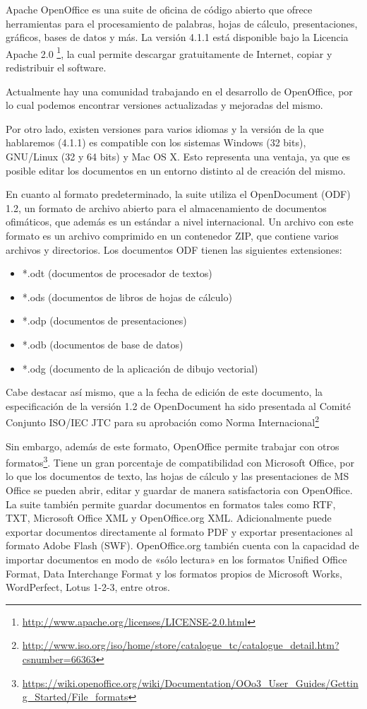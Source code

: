 \documentclass[12pt]{article}
\begin{document}
Apache OpenOffice es una suite de oficina de código abierto que ofrece herramientas para el procesamiento de palabras, hojas de cálculo, presentaciones, gráficos, bases de datos y más. La versión 4.1.1 está disponible bajo la Licencia Apache 2.0 \footnote{\url{http://www.apache.org/licenses/LICENSE-2.0.html}}, la cual permite descargar gratuitamente de Internet, copiar y redistribuir el software.   

Actualmente hay una comunidad trabajando en el desarrollo de OpenOffice, por lo cual podemos encontrar versiones actualizadas y mejoradas del mismo.

Por otro lado, existen versiones para varios idiomas y la versión de la que hablaremos (4.1.1) es compatible con los sistemas Windows (32 bits), GNU/Linux (32 y 64 bits) y Mac OS X. Esto representa una ventaja, ya que es posible editar los documentos en un entorno distinto al de creación del mismo.

En cuanto al formato predeterminado, la suite utiliza el OpenDocument (ODF) 1.2, un formato de archivo abierto para el almacenamiento de documentos ofimáticos, que además es un estándar a nivel internacional. Un archivo con este formato es un archivo comprimido en un contenedor ZIP, que contiene varios archivos y directorios. Los documentos ODF tienen las siguientes extensiones:
\begin{itemize}
\item *.odt (documentos de procesador de textos)
\item *.ods (documentos de libros de hojas de cálculo)
\item *.odp (documentos de presentaciones)
\item *.odb (documentos de base de datos)
\item *.odg (documento de la aplicación de dibujo vectorial)
\end{itemize}

Cabe destacar así mismo, que a la fecha de edición de este documento, la especificación de la versión 1.2 de OpenDocument ha sido presentada al Comité Conjunto ISO/IEC JTC para su aprobación como Norma Internacional\footnote{\url{http://www.iso.org/iso/home/store/catalogue\_tc/catalogue\_detail.htm?csnumber=66363}}

Sin embargo, además de este formato, OpenOffice permite trabajar con otros formatos\footnote{\url{https://wiki.openoffice.org/wiki/Documentation/OOo3\_User\_Guides/Getting\_Started/File\_formats}}. Tiene un gran porcentaje de compatibilidad con Microsoft Office, por lo que los documentos de texto, las hojas de cálculo y las presentaciones de MS Office se pueden abrir, editar y guardar de manera satisfactoria con OpenOffice. La suite también permite guardar documentos en formatos tales como RTF, TXT, Microsoft Office XML y OpenOffice.org XML. Adicionalmente puede exportar documentos directamente al formato PDF y exportar presentaciones al formato Adobe Flash (SWF). OpenOffice.org también cuenta con la capacidad de importar documentos en modo de «sólo lectura» en los formatos Unified Office Format, Data Interchange Format y los formatos propios de Microsoft Works, WordPerfect, Lotus 1-2-3, entre otros.
\end{document}
